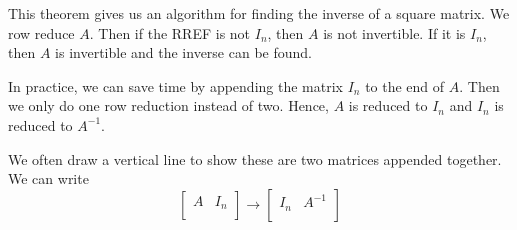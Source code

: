 \documentclass{article}
\begin{document}
\begin{remark}
  This theorem gives us an algorithm for finding the inverse of a square matrix. We row reduce $A$. Then if the RREF is not $I_n$, then $A$ is not invertible. If it is $I_n$, then $A$ is invertible and the inverse can be found.

  In practice, we can save time by appending the matrix $I_n$ to the end of $A$. Then we only do one row reduction instead of two. Hence, $A$ is reduced to $I_n$ and $I_n$ is reduced to $A^{-1}$.

  We often draw a vertical line to show these are two matrices appended together.
  We can write
  \[
    \left[
      \begin{array}{c|c}
        A &  I_n\\
      \end{array}
    \right]
    \to
    \left[
      \begin{array}{c|c}
        I_n &  A^{-1}\\
      \end{array}
    \right]
  \]
\end{remark}
\end{document}
